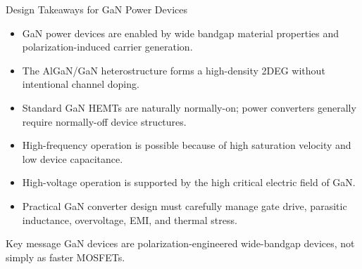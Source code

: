 \begin{frame}{Design Takeaways for GaN Power Devices}
\begin{itemize}
    \item GaN power devices are enabled by wide bandgap material properties and polarization-induced carrier generation.
    \item The AlGaN/GaN heterostructure forms a high-density 2DEG without intentional channel doping.
    \item Standard GaN HEMTs are naturally normally-on; power converters generally require normally-off device structures.
    \item High-frequency operation is possible because of high saturation velocity and low device capacitance.
    \item High-voltage operation is supported by the high critical electric field of GaN.
    \item Practical GaN converter design must carefully manage gate drive, parasitic inductance, overvoltage, EMI, and thermal stress.
\end{itemize}

\begin{block}{Key message}
GaN devices are polarization-engineered wide-bandgap devices, not simply as faster MOSFETs.
\end{block}
\end{frame}


